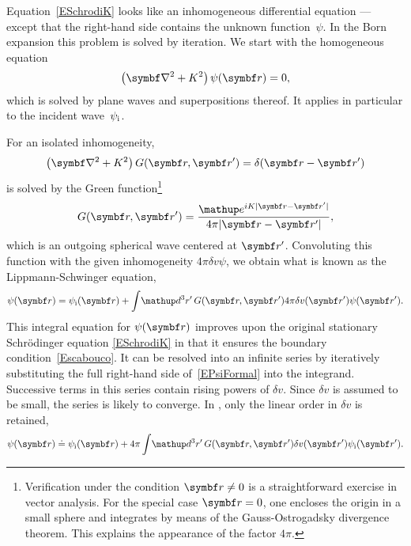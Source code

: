 Equation~\cref{ESchrodiK} looks
like an inhomogeneous differential equation ---
except that the right-hand side contains the unknown function~$\psi$.
In the Born expansion this problem is solved by iteration.
We start with the homogeneous equation
\begin{equation}\label{EHelmholtzHomog}
  \left(\Nabla^2+K^2\right)\psi(\r) = 0,
\end{equation}
which is solved by plane waves and superpositions thereof.
It applies in particular to the incident wave~$\psi_{\text{i}}$.
%

For an isolated inhomogeneity,
\begin{equation}\label{EHelmholtzForGreen}
  \left(\Nabla^2+K^2\right)G(\r,\r') = \delta(\r-\r')
\end{equation}
%
%
is solved by the Green function\footnote
{Verification under the condition $\r\ne0$
is a straightforward exercise in vector analysis.
For the special case $\r=0$,
one encloses the origin in a small sphere
and integrates by means of the Gauss-Ostrogadsky divergence theorem.
This explains the appearance of the factor $4\pi$.}
\begin{equation}\label{EGreens1}
  G(\r,\r') = \frac{\e^{iK|\r-\r'|}}{4\pi |\r-\r'|},
\end{equation}
which is an outgoing spherical wave centered at $\r'$.
Convoluting this function with the given inhomogeneity $4\pi\delta v\psi$,
we obtain what is known as the Lippmann-Schwinger equation,
\begin{equation}\label{EPsiFormal}
  \psi(\r)
  = \psi_\ti(\r)
  + \int\!\d^3r'\, G(\r,\r') 4\pi\delta v(\r')\psi(\r').
\end{equation}
This integral equation for $\psi(\r)$ improves
upon the original stationary Schrödinger equation \cref{ESchrodiK}
in that it ensures the boundary condition~\cref{Escabouco}.
It can be resolved into an infinite series
by iteratively substituting the full right-hand side of~\cref{EPsiFormal}
into the integrand.
Successive terms in this series contain rising powers of $\delta v$.
Since $\delta v$ is assumed to be small, the series is likely to converge.
In ,
only the linear order in $\delta v$ is retained,
\begin{equation}\label{EBorn}
  \psi(\r)
  \doteq \psi_\ti(\r)
  + 4\pi \int\!\d^3r'\, G(\r,\r') \delta v(\r') \psi_\ti(\r').
\end{equation}

